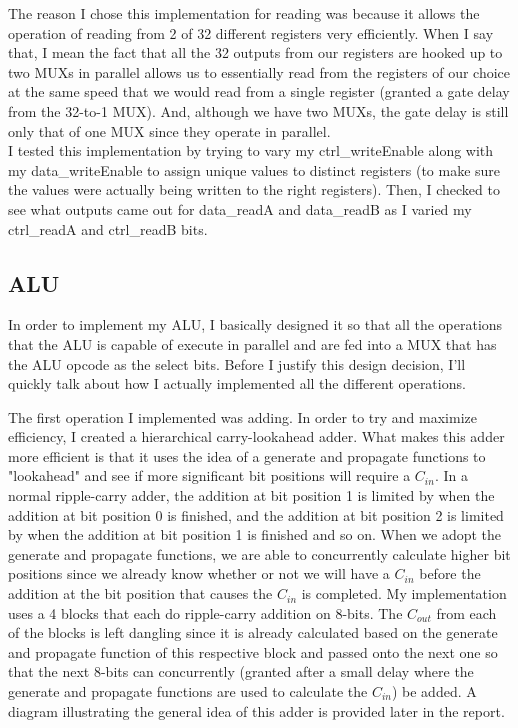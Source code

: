 \documentclass[letterpaper]{article} %
\begin{document}
    The reason I chose this implementation for reading was because it allows the operation of reading from 2 of 32 different registers very efficiently. When I say that, I mean the fact that all the 32 outputs from our registers are hooked up to two MUXs in parallel allows us to essentially read from the registers of our choice at the same speed that we would read from a single register (granted a gate delay from the 32-to-1 MUX). And, although we have two MUXs, the gate delay is still only that of one MUX since they operate in parallel. \\
    
    I tested this implementation by trying to vary my ctrl\_writeEnable along with my data\_writeEnable to assign unique values to distinct registers (to make sure the values were actually being written to the right registers). Then, I checked to see what outputs came out for data\_readA and data\_readB as I varied my ctrl\_readA and ctrl\_readB bits. \

    
\subsection{ALU}

    In order to implement my ALU, I basically designed it so that all the operations that the ALU is capable of execute in parallel and are fed into a MUX that has the ALU opcode as the select bits. Before I justify this design decision, I'll quickly talk about how I actually implemented all the different operations.
    
    The first operation I implemented was adding. In order to try and maximize efficiency, I created a hierarchical carry-lookahead adder. What makes this adder more efficient is that it uses the idea of a generate and propagate functions to "lookahead" and see if more significant bit positions will require a $C_{in}$. In a normal ripple-carry adder, the addition at bit position 1 is limited by when the addition at bit position 0 is finished, and the addition at bit position 2 is limited by when the addition at bit position 1 is finished and so on. When we adopt the generate and propagate functions, we are able to concurrently calculate higher bit positions since we already know whether or not we will have a $C_{in}$ before the addition at the bit position that causes the $C_{in}$ is completed. My implementation uses a 4 blocks that each do ripple-carry addition on 8-bits. The $C_{out}$ from each of the blocks is left dangling since it is already calculated based on the generate and propagate function of this respective block and passed onto the next one so that the next 8-bits can concurrently (granted after a small delay where the generate and propagate functions are used to calculate the $C_{in}$) be added. A diagram illustrating the general idea of this adder is provided later in the report. \\
    
\end{document}
